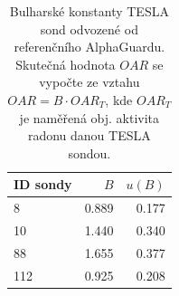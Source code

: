 \documentclass[11pt,a4paper]{article}
\begin{document}
\begin{table}[ht]
\centering
\caption{Bulharské konstanty TESLA sond odvozené od referenčního AlphaGuardu. Skutečná hodnota $OAR$ se vypočte ze vztahu $OAR=B\cdot OAR_T$, kde $OAR_T$ je naměřená obj. aktivita radonu danou TESLA sondou.}
\begin{tabular}{lrr}
	\toprule
	ID sondy &     $B$ &  $u(B)$ \\
	\midrule
	8   & 0.889 &  0.177 \\
	10  & 1.440 &  0.340 \\
	88  & 1.655 &  0.377 \\
	112 & 0.925 &  0.208 \\
	\bottomrule
\end{tabular}
\end{table}
\end{document}
